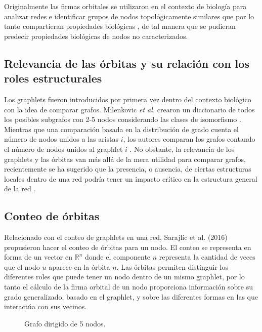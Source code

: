 Originalmente las firmas orbitales se utilizaron en el contexto de biología para analizar redes e identificar grupos de nodos topológicamente similares que por lo tanto compartieran propiedades biológicas \cite{milenkovic_uncovering_2008}, de tal manera que se pudieran predecir propiedades biológicas de nodos no caracterizados.

\subsection{Relevancia de las órbitas y su relación con los roles estructurales}

Los graphlets fueron introducidos por primera vez dentro del contexto biológico con la idea de comparar grafos. Milenkovic \textit{et al.} crearon un diccionario de todos los posibles subgrafos con 2-5 nodos considerando las clases de isomorfismo \cite{milenkovic_uncovering_2008}. Mientras que una comparación basada en la distribución de grado cuenta el número de nodos unidos a las aristas $i$, los autores comparan los grafos contando el número de nodos unidos al graphlet $i$ \citep{sarajlic_graphlet-based_2016}. No obstante, la relevancia de los graphlets y las órbitas van más allá de la mera utilidad para comparar grafos, recientemente se ha sugerido que la presencia, o ausencia, de ciertas estructuras locales dentro de una red podría tener un impacto crítico en la estructura general de la red \cite{lusher_exponential_nodate}.

\subsection{Conteo de órbitas}

Relacionado con el conteo de graphlets en una red, Sarajlíc et al. (2016) \cite{sarajlic_graphlet-based_2016} propusieron hacer el conteo de órbitas para un nodo. El conteo se representa en forma de un vector en $\mathbb{R}^{n}$ donde el componente $n$ representa la cantidad de veces que el nodo $u$ aparece en la órbita $n$. Las órbitas permiten distinguir los diferentes roles que puede tener un nodo dentro de un mismo graphlet, por lo tanto el cálculo de la firma orbital de un nodo proporciona información sobre su grado generalizado, basado en el graphlet, y sobre las diferentes formas en las que interactúa con sus vecinos. 

 \begin{figure}[htbp]
  \centering
  
    \caption{Grafo dirigido de 5 nodos.}
    \label{fig:examplecount}
\end{figure}

